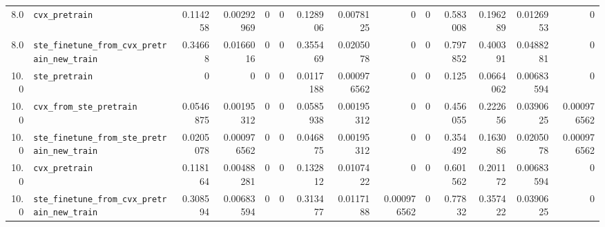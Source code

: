 \begin{longtable}{@{}r l *{12}{r}@{}}
8.0 & \texttt{cvx\_pretrain} & 0.114258 & 0.00292969 & 0 & 0 & 0.128906 & 0.0078125 & 0 & 0 & 0.583008 & 0.196289 & 0.0126953 & 0 \\
8.0 & \texttt{ste\_finetune\_from\_cvx\_pretrain\_new\_train} & 0.34668 & 0.0166016 & 0 & 0 & 0.355469 & 0.0205078 & 0 & 0 & 0.797852 & 0.400391 & 0.0488281 & 0 \\
10.0 & \texttt{ste\_pretrain} & 0 & 0 & 0 & 0 & 0.0117188 & 0.000976562 & 0 & 0 & 0.125 & 0.0664062 & 0.00683594 & 0 \\
10.0 & \texttt{cvx\_from\_ste\_pretrain} & 0.0546875 & 0.00195312 & 0 & 0 & 0.0585938 & 0.00195312 & 0 & 0 & 0.456055 & 0.222656 & 0.0390625 & 0.000976562 \\
10.0 & \texttt{ste\_finetune\_from\_ste\_pretrain\_new\_train} & 0.0205078 & 0.000976562 & 0 & 0 & 0.046875 & 0.00195312 & 0 & 0 & 0.354492 & 0.163086 & 0.0205078 & 0.000976562 \\
10.0 & \texttt{cvx\_pretrain} & 0.118164 & 0.00488281 & 0 & 0 & 0.132812 & 0.0107422 & 0 & 0 & 0.601562 & 0.201172 & 0.00683594 & 0 \\
10.0 & \texttt{ste\_finetune\_from\_cvx\_pretrain\_new\_train} & 0.308594 & 0.00683594 & 0 & 0 & 0.313477 & 0.0117188 & 0.000976562 & 0 & 0.77832 & 0.357422 & 0.0390625 & 0 \\
\end{longtable}


